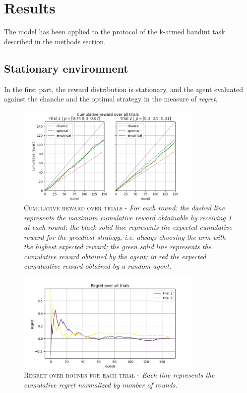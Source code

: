 
\section{Results}

The model has been applied to the protocol of the k-armed bandint task described in the methods section.



\subsection{Stationary environment}
In the first part, the reward distribution is stationary, and the agent evaluated against the chanche and the optimal strategy in the measure of \textit{regret}.


\begin{figure}[ht]
    \centering
    \includegraphics[width=0.8\textwidth]{figures/hsnn_results_trials_1.png}
    \caption{\textsc{Cumulative reward over trials - }\textit{For each round: the dashed line represents the maximum cumulative reward obtainable by receiving 1 at each round; the black solid line represents the expected cumulative reward for the greediest strategy, i.e. always choosing the arm with the
    highest expected reward; the green solid line represents the cumulative reward obtained by the agent; in red the expected cumuluative reward obtained by a random agent.}}
    \label{fig:results_trials_1}
\end{figure}

\begin{figure}[ht]
    \centering
    \includegraphics[width=0.8\textwidth]{figures/hsnn_results_regret_1.png}
    \caption{\textsc{Regret over rounds for each trial - }\textit{Each line represents the cumulative regret normalized by number of rounds.}}
    \label{fig:results_regret_1}
\end{figure}


